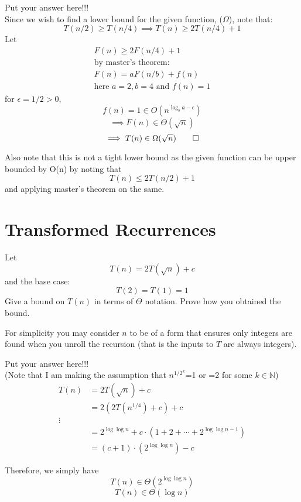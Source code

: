 \documentclass[a4paper,10pt]{article}
\newenvironment{answer}[1][height fill] {
    \begin{tcolorbox}[#1]
}
{
    \end{tcolorbox}
}
\begin{document}
\begin{answer}
    Put your answer here!!!\\
    Since we wish to find a lower bound for the given function, ($\Omega$), note that:
    $$T(n/2) \geq T(n/4) \implies T(n) \geq 2T(n/4)+1$$
    Let
    \begin{align*}
    	F(n) \geq 2F(n/4)+1 \\
    	\text{by master's theorem:} \\
    	F(n) = aF(n/b)+f(n)\\
    	\text{here } a=2, b=4 \text{ and } f(n)=1
    \end{align*}
    for $\epsilon=1/2>0$, 
    $$ f(n) = 1 \in O(n^{\log_b{a}-\epsilon})$$
    $$ \implies F(n) \in \Theta(\sqrt{n}) $$
    $$ \implies T(n) \in \Omega(\sqrt{n}) \qed$$

    Also note that this is not a tight lower bound as the given function can be upper bounded by O(n) by noting that 
    $$ T(n) \leq 2T(n/2)+1 $$
    and applying master's theorem on the same.
\end{answer}



\section{Transformed Recurrences}
Let 
$$T(n) = 2T(\sqrt{n}) + c$$
and the base case:
$$T(2) = T(1) = 1$$
Give a bound on $T(n)$ in terms of $\Theta$ notation. Prove how you obtained the bound.

For simplicity you may consider $n$ to be of a form that ensures only integers are found when you unroll the recursion (that is the inputs to $T$ are always integers).

\begin{answer}
    Put your answer here!!!\\
     (Note that I am making the assumption that $n^{1/2^{k}}$=1 or =2 for some $k \in \mathbb{N}$)\\
    \begin{align*}
    	T(n) &= 2T(\sqrt{n})+c\\
    	&= 2(2T(n^{1/4})+c)+c\\
    	\vdots \\
    	&= 2^{\log{\log{n}}}+c\cdot(1+2+\cdots+2^{\log{\log{n}}-1})\\
    	&= (c+1)\cdot(2^{\log{\log{n}}})-c
    \end{align*}

    Therefore, we simply have 
    $$ T(n) \in \Theta(2^{\log{\log{n}}}) $$
    $$ T(n) \in \Theta(\log{n}) $$

\end{answer}
\end{document}
